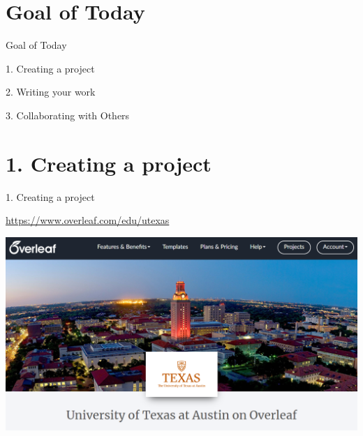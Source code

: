 \documentclass[13pt]{beamer}
\newcommand{\green}{\textcolor{colorgreen}}
\begin{document}
\section{Goal of Today}
\begin{frame}{Goal of Today}
 \begin{fullpageitemize}
    \item 1. Creating a project
    \item 2. Writing your work 
    \item 3. Collaborating with Others
 \end{fullpageitemize}
\end{frame}

\section{1. Creating a project}

\begin{frame}{1. Creating a project}

\green{\footnotesize{\url{https://www.overleaf.com/edu/utexas}}} \hfill \break

\includegraphics[width=\textwidth,keepaspectratio]{images/ut_overleaf.png}

\end{frame}


\end{document}
